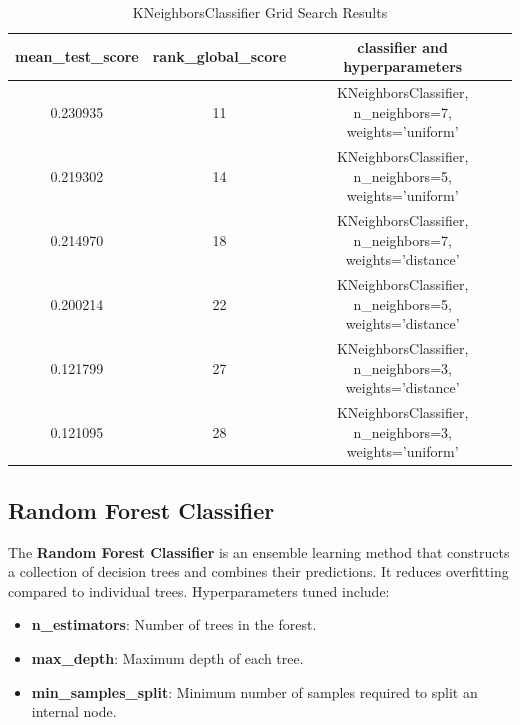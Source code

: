 \documentclass{article}
\begin{document}
\begin{table}[bhtp]
    \centering
    \caption{KNeighborsClassifier Grid Search Results}
    \label{tab:table}
    \begin{tabular}{ccc}
    \toprule
    \textbf{mean\_test\_score} & \textbf{rank\_global\_score} & \textbf{classifier and hyperparameters} \\
    \midrule
    0.230935 & 11 & KNeighborsClassifier, n\_neighbors=7, weights='uniform' \\
    0.219302 & 14 & KNeighborsClassifier, n\_neighbors=5, weights='uniform' \\
    0.214970 & 18 & KNeighborsClassifier, n\_neighbors=7, weights='distance' \\
    0.200214 & 22 & KNeighborsClassifier, n\_neighbors=5, weights='distance' \\
    0.121799 & 27 & KNeighborsClassifier, n\_neighbors=3, weights='distance' \\
    0.121095 & 28 & KNeighborsClassifier, n\_neighbors=3, weights='uniform' \\
    \bottomrule
    \end{tabular}
\end{table}
    
\subsection{Random Forest Classifier}

The \textbf{Random Forest Classifier} is an ensemble learning method that constructs a collection of
decision trees and combines their predictions. It reduces overfitting compared to individual trees.
Hyperparameters tuned include:
\begin{itemize}
    \item \textbf{n\_estimators}: Number of trees in the forest.
    \item \textbf{max\_depth}: Maximum depth of each tree.
    \item \textbf{min\_samples\_split}: Minimum number of samples required to split an internal node.
\end{itemize}
\end{document}
